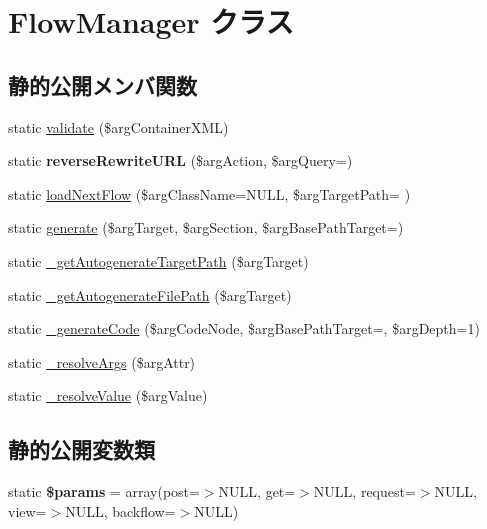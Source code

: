 \hypertarget{class_flow_manager}{}\section{Flow\+Manager クラス}
\label{class_flow_manager}
\subsection*{静的公開メンバ関数}
\begin{DoxyCompactItemize}
\item 
static \hyperlink{class_flow_manager_a6af8cf1d11afa9ba639fc2e2118070b4}{validate} (\$arg\+Container\+X\+M\+L)
\item 
\hypertarget{class_flow_manager_a5d92e9d445a8bf523f7f12e83e68a344}{}static {\bfseries reverse\+Rewrite\+U\+R\+L} (\$arg\+Action, \$arg\+Query=\textquotesingle{}\textquotesingle{})\label{class_flow_manager_a5d92e9d445a8bf523f7f12e83e68a344}

\item 
static \hyperlink{class_flow_manager_aec2bdc919808a821598cfedf427dd6fd}{load\+Next\+Flow} (\$arg\+Class\+Name=N\+U\+L\+L, \$arg\+Target\+Path= \textquotesingle{}\textquotesingle{})
\item 
static \hyperlink{class_flow_manager_a514963c4885f0eaedd17ec5193cf276a}{generate} (\$arg\+Target, \$arg\+Section, \$arg\+Base\+Path\+Target=\textquotesingle{}\textquotesingle{})
\item 
static \hyperlink{class_flow_manager_a3bc3ae3b6b4efea3c010942ca1e2bab7}{\+\_\+get\+Autogenerate\+Target\+Path} (\$arg\+Target)
\item 
static \hyperlink{class_flow_manager_a331069b41a81d00cac4685158ef8f575}{\+\_\+get\+Autogenerate\+File\+Path} (\$arg\+Target)
\item 
static \hyperlink{class_flow_manager_a22727b3f5902ba4d86017f5552e20718}{\+\_\+generate\+Code} (\$arg\+Code\+Node, \$arg\+Base\+Path\+Target=\textquotesingle{}\textquotesingle{}, \$arg\+Depth=1)
\item 
static \hyperlink{class_flow_manager_a32c69da4b4be7d0f0b67b080b4a1bc0d}{\+\_\+resolve\+Args} (\$arg\+Attr)
\item 
static \hyperlink{class_flow_manager_aca9727acaadc1b0bc967bb68ede97d73}{\+\_\+resolve\+Value} (\$arg\+Value)
\end{DoxyCompactItemize}
\subsection*{静的公開変数類}
\begin{DoxyCompactItemize}
\item 
\hypertarget{class_flow_manager_a336fb1b43e5db055c4528f204da29418}{}static {\bfseries \$params} = array(\textquotesingle{}post\textquotesingle{}=$>$N\+U\+L\+L, \textquotesingle{}get\textquotesingle{}=$>$N\+U\+L\+L, \textquotesingle{}request\textquotesingle{}=$>$N\+U\+L\+L, \textquotesingle{}view\textquotesingle{}=$>$N\+U\+L\+L, \textquotesingle{}backflow\textquotesingle{}=$>$N\+U\+L\+L)\label{class_flow_manager_a336fb1b43e5db055c4528f204da29418}

\end{DoxyCompactItemize}


